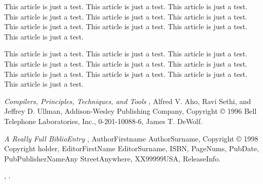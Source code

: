 \documentclass[pdftex,english,a4paper,10pt,twocolumn]{infocom}
\begin{document}
This article is just a test. This article is just a test.
This article is just a test. This article is just a test. 
This article is just a test. This article is just a test. 
This article is just a test. This article is just a test. 
This article is just a test. This article is just a test. 


This article is just a test. This article is just a test.
This article is just a test. This article is just a test. 
This article is just a test. This article is just a test. 
This article is just a test. This article is just a test. 
This article is just a test. This article is just a test. 

%	
%	

\begin{thebibliography}{WIDELABEL}

\emph{Compilers, Principles, Techniques, and Tools} , Alfred V. Aho, Ravi Sethi, and Jeffrey D. Ullman, Addison-Wesley Publishing Company, Copyright \copyright{} 1996 Bell Telephone Laboratories, Inc., 0-201-10088-6, James T. DeWolf. \label{id2719650}


\emph{A Really Full BiblioEntry} , AuthorFirstname AuthorSurname, Copyright \copyright{} 1998 Copyright holder, EditorFirstName EditorSurname, ISBN, PageNums, PubDate, PubPublisherNameAny StreetAnywhere, XX99999USA, ReleaseInfo. \label{id2719933}


\emph{} , . \label{walsh97}


\end{thebibliography}

\end{document}
